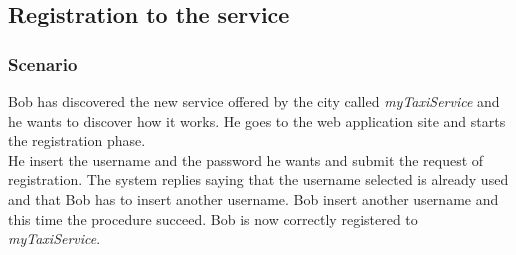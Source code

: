 \subsection{Registration to the service}
\subsubsection{Scenario}
Bob has discovered the new service offered by the city called \textit{myTaxiService} and he wants to discover how it works. He goes to the web application site and starts the registration phase.\\
He insert the username and the password he wants and submit the request of registration. The system replies saying that the username selected is already used and that Bob has to insert another username. Bob insert another username and this time the procedure succeed. Bob is now correctly registered to \textit{myTaxiService}.
\pagebreak
